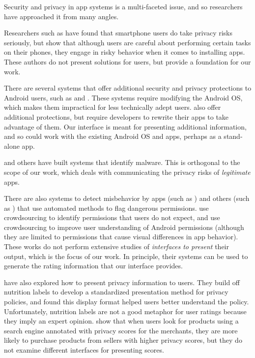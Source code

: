 \documentclass[11pt]{article}
\begin{document}
Security and privacy in app systems is a multi-faceted issue, and 
so researchers have approached it from many angles.

Researchers such as \citet{99-problems-SPSM12} have found 
that smartphone users do take privacy risks seriously, but
\citet{smartphone-user-conf-SOUPS12} show that although
users are careful about
performing certain tasks on their phones, they engage in risky behavior
when it comes to installing apps. These
authors do not present solutions for users, but 
provide a foundation for our work.

There are several systems that offer additional 
security and privacy protections to Android users, such as 
\citet{mockDroid-HOTMOBILE11} and \citet{TISSA-Trust11}. 
These systems require modifying
the Android OS, which makes them impractical
for less technically adept users. 
\citet{dr-android-hide-SPSM12} also offer additional
protections, but require developers to rewrite their
apps to take advantage of them.
Our interface is meant
for presenting additional information, and so could work
with the existing Android OS and apps, perhaps as a stand-alone app.

\citet{android-repackaged-CODASPY12} and others have
built systems that identify
malware. This is orthogonal to the scope of our work, which
deals with communicating the privacy risks of \emph{legitimate} apps.

There are also systems to detect misbehavior by apps (such as
\citet{taintDroid-OSDI10})
and others (such as \citet{droidrisk-2013}) that use
automated methods to flag dangerous permissions.
\citet{expect-purpose-UbiComp12}
use crowdsourcing to identify permissions that users do not expect,
and \citet{droidganger-SPSM12} use crowdsourcing to improve user 
understanding of Android permissions (although they are limited
to permissions that cause visual differences in app behavior). 
These works do not perform
extensive studies of \emph{interfaces to present} their output, which
is the focus of our work. In principle, their systems can be used to
generate the rating information that our interface provides.

\citet{nutrition-labels-SOUPS09} have also explored how to 
present privacy information to users.
They build off nutrition labels to develop a standardized 
presentation method for privacy policies, and found this 
display format helped users better understand the policy. 
Unfortunately, nutrition labels are not a good 
metaphor for user ratings because they imply an expert 
opinion. \citet{privacy-purchasing-effect-INFORMS11} 
show that when users look for products using a search engine 
annotated with privacy scores for the merchants, they are more 
likely to purchase products from sellers with higher privacy scores,
but they do not examine different interfaces for presenting
scores.
\end{document}
